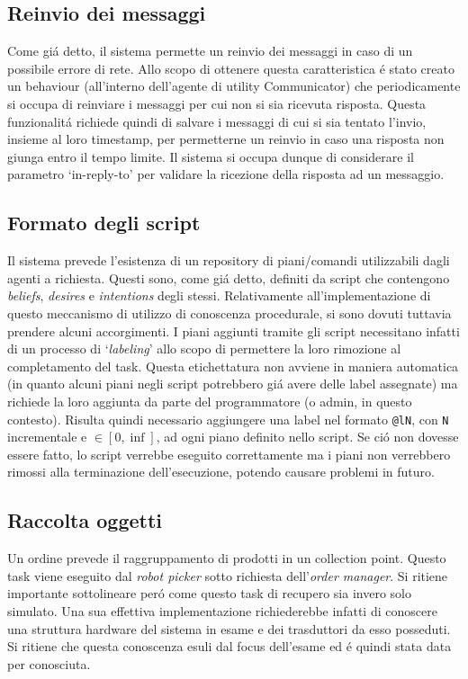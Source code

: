 \subsection{Reinvio dei messaggi}
Come gi\'a detto, il sistema permette un reinvio dei messaggi in caso di un possibile errore di rete. Allo scopo di ottenere questa caratteristica \'e stato creato un behaviour (all'interno dell'agente di utility Communicator) che periodicamente si occupa di reinviare i messaggi per cui non si sia ricevuta risposta. Questa funzionalit\'a richiede quindi di salvare i messaggi di cui si sia tentato l'invio, insieme al loro timestamp, per permetterne un reinvio in caso una risposta non giunga entro il tempo limite. Il sistema si occupa dunque di considerare il parametro `in-reply-to' per validare la ricezione della risposta ad un messaggio.

\subsection{Formato degli script}
Il sistema prevede l'esistenza di un repository di piani/comandi utilizzabili dagli agenti a richiesta. Questi sono, come gi\'a detto, definiti da script che contengono \textit{beliefs}, \textit{desires} e \textit{intentions} degli stessi. Relativamente all'implementazione di questo meccanismo di utilizzo di conoscenza procedurale, si sono dovuti tuttavia prendere alcuni accorgimenti. I piani aggiunti tramite gli script necessitano infatti di un processo di `\textit{labeling}' allo scopo di permettere la loro rimozione al completamento del task. Questa etichettatura non avviene in maniera automatica (in quanto alcuni piani negli script potrebbero gi\'a avere delle label assegnate) ma richiede la loro aggiunta da parte del programmatore (o admin, in questo contesto). Risulta quindi necessario aggiungere una label nel formato \texttt{@lN}, con \texttt{N} incrementale e $\in [0, \inf]$, ad ogni piano definito nello script. Se ci\'o non dovesse essere fatto, lo script verrebbe eseguito correttamente ma i piani non verrebbero rimossi alla terminazione dell'esecuzione, potendo causare problemi in futuro. 

\subsection{Raccolta oggetti}
Un ordine prevede il raggruppamento di prodotti in un collection point. Questo task viene eseguito dal \textit{robot picker} sotto richiesta dell'\textit{order manager}. Si ritiene importante sottolineare per\'o come questo task di recupero sia invero solo simulato. Una sua effettiva implementazione richiederebbe infatti di conoscere una struttura hardware del sistema in esame e dei trasduttori da esso posseduti. Si ritiene che questa conoscenza esuli dal focus dell'esame ed \'e quindi stata data per conosciuta.
